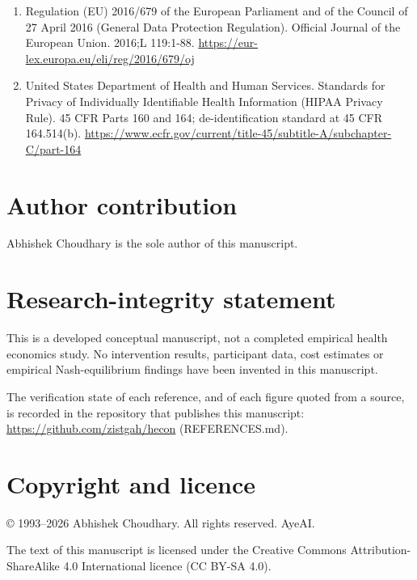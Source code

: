 \documentclass[11pt,a4paper]{article}
\begin{document}
\begin{enumerate}[leftmargin=*]
\item Regulation (EU) 2016/679 of the European Parliament and of the Council of 27 April 2016 (General Data Protection Regulation). Official Journal of the European Union. 2016;L 119:1-88. \url{https://eur-lex.europa.eu/eli/reg/2016/679/oj}
\item United States Department of Health and Human Services. Standards for Privacy of Individually Identifiable Health Information (HIPAA Privacy Rule). 45 CFR Parts 160 and 164; de-identification standard at 45 CFR 164.514(b). \url{https://www.ecfr.gov/current/title-45/subtitle-A/subchapter-C/part-164}
\end{enumerate}
\section*{Author contribution}
Abhishek Choudhary is the sole author of this manuscript.
\section*{Research-integrity statement}
This is a developed conceptual manuscript, not a completed empirical health economics study. No intervention results, participant data, cost estimates or empirical Nash-equilibrium findings have been invented in this manuscript.

The verification state of each reference, and of each figure quoted from a source, is recorded in the repository that publishes this manuscript: \url{https://github.com/zistgah/hecon} (REFERENCES.md).
\section*{Copyright and licence}
© 1993--2026 Abhishek Choudhary. All rights reserved. AyeAI.

The text of this manuscript is licensed under the Creative Commons Attribution-ShareAlike 4.0 International licence (CC BY-SA 4.0).
\end{document}
